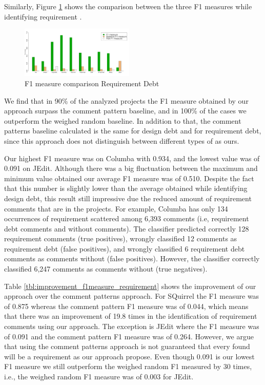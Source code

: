 Similarly, Figure \ref{fig:f1_measure_comparison_requeriment} shows the comparison between the three F1 measures while identifying requirement \SATD.

\begin{figure}[thb!]
  \centering
  \includegraphics[width=0.48\textwidth]{figures/f1_measure_comparison_requirement_2.pdf}
  \vspace{-3mm}
  \caption{F1 measure comparison Requirement Debt}
  \label{fig:f1_measure_comparison_requeriment}
\end{figure}

We find that in 90\% of the analyzed projects the F1 measure obtained by our approach surpass the comment pattern baseline, and in 100\% of the cases we outperform the weighed random baseline. In addition to that, the comment patterns baseline calculated is the same for design debt and for requirement debt, since this approach does not distinguish between different types of \SATD as ours. 

Our highest F1 measure was on Columba with 0.934, and the lowest value was of 0.091 on JEdit. Although there was a big fluctuation between the maximum and minimum value obtained our average F1 measure was of 0.510. Despite the fact that this number is slightly lower than the average obtained while  identifying design debt, this result still impressive due the reduced amount of requirement \SATD comments that are in the projects. For example, Columba has only 134 occurrences of requirement \SATD scattered among 6,393 comments (i.e, requirement debt comments and without \SATD comments). The classifier predicted correctly 128 requirement \SATD comments (true positives), wrongly classified 12 comments as requirement debt (false positives), and wrongly classified 6 requirement debt comments as comments without \SATD (false positives). However, the classifier correctly classified 6,247 comments as comments without \SATD (true negatives).

Table \ref{tbl:improvement_f1measure_requirement} shows the improvement of our approach over the comment patterns approach. For SQuirrel the F1 measure was of 0.875 whereas the comment pattern F1 measure was of 0.044, which means that there was an improvement of 19.8 times in the identification of requirement \SATD comments using our approach. The exception is JEdit where the F1 measure was of 0.091 and the comment pattern F1 measure was of 0.264. However, we argue that using the comment patterns approach is not guaranteed that every \SATD found will be a requirement \SATD as our approach propose. Even though 0.091 is our lowest F1 measure we still outperform the weighed random F1 measured by 30 times, i.e., the weighed random F1 measure was of 0.003 for JEdit. 

